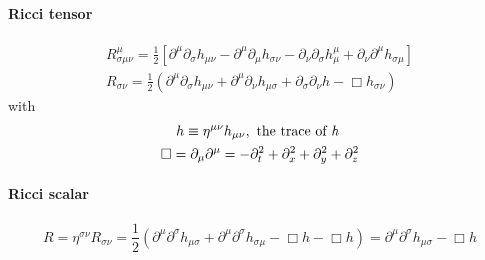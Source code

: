 \paragraph{Ricci tensor}

\begin{gather}
R^{\mu }_{\sigma \mu \nu } = \frac{1}{2}\left[ \partial^{\mu }\partial_{\sigma }h_{\mu \nu }- \partial^{\mu }\partial_{\mu }h_{\sigma \nu } - \partial_{\nu }\partial_{\sigma }h^{\mu }_{\mu }+ \partial_{\nu }\partial^{\mu }h_{\sigma \mu } \right] \nonumber\\
R_{\sigma \nu } = \frac{1}{2} \left( \partial^{\mu }\partial_{\sigma }h_{\mu \nu } + \partial^{\mu }\partial_{\nu  }h_{\mu \sigma }+ \partial_{\sigma }\partial_{\nu }h-\Box h_{\sigma \nu } \right)\label{eq:lingriccitns}
\end{gather}
with
\begin{gather*}
h \equiv \eta ^{\mu \nu }h_{\mu \nu }, \text{ the trace of \emph{h} } \\
\Box = \partial_{\mu }\partial^{\mu } = -\partial^{2}_{t} + \partial^{2}_{x}+\partial^{2}_{y}+\partial^{2}_{z}
\end{gather*}
\paragraph{Ricci scalar}
\begin{equation}
R = \eta ^{\sigma \nu }R_{\sigma \nu } = \frac{1}{2}\left( \partial^{\mu }\partial^{\sigma }h_{\mu \sigma }+ \partial^{\mu }\partial^{\sigma }h_{\sigma \mu }-\Box h -\Box h \right)= \partial^{\mu }\partial^{\sigma }h_{\mu \sigma }-\Box h
\end{equation}

